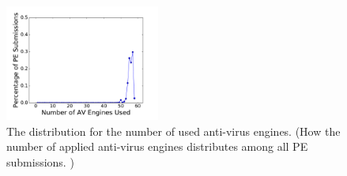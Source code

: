 \begin{figure}[t!]
\begin{center}
\includegraphics[width=2in]{figure/numVendor}
\caption{The distribution for the number of used anti-virus engines.
(How the number of applied anti-virus engines distributes among all PE submissions.
)
}
\label{fig:vendornum}

\end{center}
\end{figure}